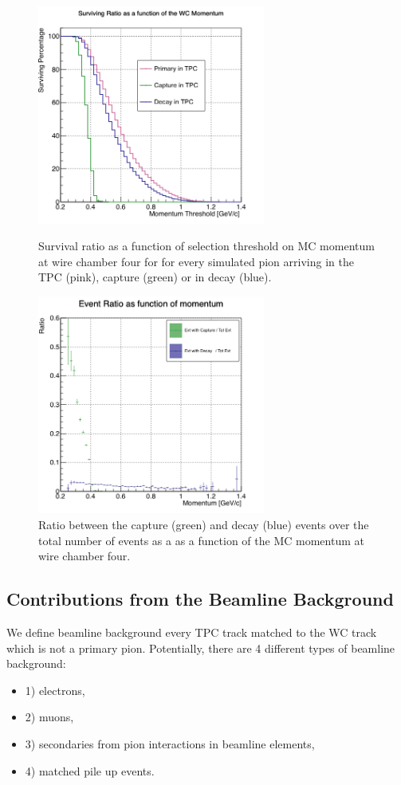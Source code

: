 \begin{figure}[]
\centering
\begin{minipage}[t]{0.45\textwidth}
\centering
\includegraphics[width=7.5cm]{Chapter-7/Images/CDThreshold.png}
\caption{Survival ratio as a function of selection threshold on MC momentum at wire chamber four for for every simulated pion arriving in the TPC (pink), capture (green) or in decay (blue).   }
\label{fig:survRatio}
\end{minipage}\hfill
\begin{minipage}[t]{0.45\textwidth}
\centering
\includegraphics[width=7.5cm]{Chapter-7/Images/CDRatio.png}
\caption{Ratio between the capture (green) and decay (blue) events over the total number of events as a as a function of the MC momentum at wire chamber four.}
\label{fig:evtRatio}
\end{minipage}
\end{figure}

\clearpage
\subsection{Contributions from the Beamline Background}\label{ch:PionXSBkgSub2}
We define beamline background every TPC track matched to the WC track which is not a primary pion. Potentially, there are 4 different types of beamline background:
\begin{itemize}
\item[]1) electrons,
\item[]2) muons,
\item[]3) secondaries from pion interactions in beamline elements,
\item[]4) matched pile up events.
\end{itemize}

